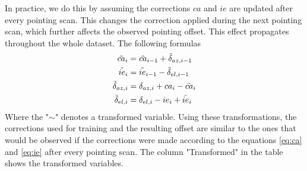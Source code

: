 In practice, we do this by assuming the corrections $ca$ and $ie$ are updated after every pointing scan.
This changes the correction applied during the next pointing scan, which further affects the observed pointing offset.
This effect propagates throughout the whole dataset.
The following formulas 
\begin{align}
    \Tilde{ca}_i &= \Tilde{ca}_{i-1} + \Tilde{\delta}_{az,i-1}\label{eq:ca_tilde}\\
    \Tilde{ie}_i &= \Tilde{ie}_{i-1} - \Tilde{\delta}_{el,i-1\label{eq:ie_tilde}}\\
    \Tilde{\delta}_{az,i} &= \delta_{az,i} + ca_i - \Tilde{ca}_i\label{eq:off_az_tilde}\\
    \Tilde{\delta}_{el,i} &= \delta_{el,i} - ie_i + \Tilde{ie}_i\label{eq:off_el_tilde}
\end{align}
Where the "$\sim$" denotes a transformed variable.
Using these transformations,
the corrections used for training and the resulting offset are similar to the ones that would be observed if the corrections were made according to the equations
\eqref{eq:ca} and \eqref{eq:ie} after every pointing scan. The column "Transformed" in the table shows the transformed variables.

